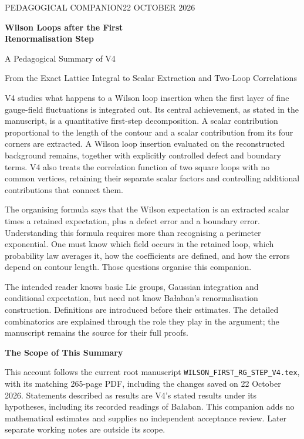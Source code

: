 \documentclass[11pt,a4paper]{article}
\newcommand{\subhead}[1]{\par\vspace{4pt}\textbf{\color{ink}#1}\par}
\begin{document}
\thispagestyle{empty}
{\small\color{muted}PEDAGOGICAL COMPANION\hfill 22 OCTOBER 2026\par}
\vspace{23pt}
{\Huge\bfseries\color{ink}Wilson Loops after the First\\[5pt]Renormalisation Step\par}
\vspace{13pt}
{\LARGE A Pedagogical Summary of V4\par}
\vspace{15pt}
{\large From the Exact Lattice Integral to Scalar Extraction and Two-Loop Correlations\par}
\vspace{23pt}

V4 studies what happens to a Wilson loop insertion when the first layer of fine gauge-field fluctuations is integrated out. Its central achievement, as stated in the manuscript, is a quantitative first-step decomposition. A scalar contribution proportional to the length of the contour and a scalar contribution from its four corners are extracted. A Wilson loop insertion evaluated on the reconstructed background remains, together with explicitly controlled defect and boundary terms. V4 also treats the correlation function of two square loops with no common vertices, retaining their separate scalar factors and controlling additional contributions that connect them.

The organising formula says that the Wilson expectation is an extracted scalar times a retained expectation, plus a defect error and a boundary error.
Understanding this formula requires more than recognising a perimeter exponential. One must know which field occurs in the retained loop, which probability law averages it, how the coefficients are defined, and how the errors depend on contour length. Those questions organise this companion.

The intended reader knows basic Lie groups, Gaussian integration and conditional expectation, but need not know Ba{\l}aban's renormalisation construction. Definitions are introduced before their estimates. The detailed combinatorics are explained through the role they play in the argument; the manuscript remains the source for their full proofs.

\subhead{The Scope of This Summary}
This account follows the current root manuscript \texttt{WILSON\_FIRST\_RG\_STEP\_V4.tex}, with its matching 265-page PDF, including the changes saved on 22 October 2026. Statements described as results are V4's stated results under its hypotheses, including its recorded readings of Ba{\l}aban. This companion adds no mathematical estimates and supplies no independent acceptance review. Later separate working notes are outside its scope.
\end{document}
